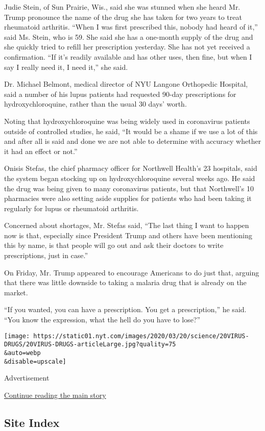 Judie Stein, of Sun Prairie, Wis., said she was stunned when she heard
Mr. Trump pronounce the name of the drug she has taken for two years to
treat rheumatoid arthritis. ``When I was first prescribed this, nobody
had heard of it,'' said Ms. Stein, who is 59. She said she has a
one-month supply of the drug and she quickly tried to refill her
prescription yesterday. She has not yet received a confirmation. ``If
it's readily available and has other uses, then fine, but when I say I
really need it, I need it,'' she said.

Dr. Michael Belmont, medical director of NYU Langone Orthopedic
Hospital, said a number of his lupus patients had requested 90-day
prescriptions for hydroxychloroquine, rather than the usual 30 days'
worth.

Noting that hydroxychloroquine was being widely used in coronavirus
patients outside of controlled studies, he said, ``It would be a shame
if we use a lot of this and after all is said and done we are not able
to determine with accuracy whether it had an effect or not.''

Onisis Stefas, the chief pharmacy officer for Northwell Health's 23
hospitals, said the system began stocking up on hydroxychloroquine
several weeks ago. He said the drug was being given to many coronavirus
patients, but that Northwell's 10 pharmacies were also setting aside
supplies for patients who had been taking it regularly for lupus or
rheumatoid arthritis.

Concerned about shortages, Mr. Stefas said, ``The last thing I want to
happen now is that, especially since President Trump and others have
been mentioning this by name, is that people will go out and ask their
doctors to write prescriptions, just in case.''

On Friday, Mr. Trump appeared to encourage Americans to do just that,
arguing that there was little downside to taking a malaria drug that is
already on the market.

``If you wanted, you can have a prescription. You get a prescription,''
he said. ``You know the expression, what the hell do you have to lose?''

\texttt{[image: https://static01.nyt.com/images/2020/03/20/science/20VIRUS-DRUGS/20VIRUS-DRUGS-articleLarge.jpg?quality=75\\\&auto=webp\\\&disable=upscale]}

Advertisement

\protect\hyperlink{after-bottom}{Continue reading the main story}

\hypertarget{site-index}{%
\subsection{Site Index}\label{site-index}}

